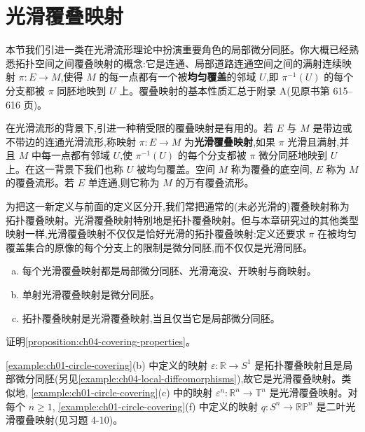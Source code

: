 \documentclass[../../main.tex]{subfiles}
\begin{document}
\section{光滑覆叠映射}\label{section:ch04-光滑覆叠映射}

本节我们引进一类在光滑流形理论中扮演重要角色的局部微分同胚。你大概已经熟悉拓扑空间之间覆叠映射的概念:它是连通、局部道路连通空间之间的满射连续映射 $\pi:E\to M$,使得 $M$ 的每一点都有一个被\textbf{均匀覆盖}的邻域 $U$,即 $\pi^{-1}(U)$ 的每个分支都被 $\pi$ 同胚地映到 $U$ 上。覆叠映射的基本性质汇总于附录 A(见原书第 615--616 页)。

在光滑流形的背景下,引进一种稍受限的覆叠映射是有用的。若 $E$ 与 $M$ 是带边或不带边的连通光滑流形,称映射 $\pi:E\to M$ 为\textbf{光滑覆叠映射},如果 $\pi$ 光滑且满射,并且 $M$ 中每一点都有邻域 $U$,使 $\pi^{-1}(U)$ 的每个分支都被 $\pi$ 微分同胚地映到 $U$ 上。在这一背景下我们也称 $U$ 被均匀覆盖。空间 $M$ 称为覆叠的底空间, $E$ 称为 $M$ 的覆叠流形。若 $E$ 单连通,则它称为 $M$ 的万有覆叠流形。

为把这一新定义与前面的定义区分开,我们常把通常的(未必光滑的)覆叠映射称为拓扑覆叠映射。光滑覆叠映射特别地是拓扑覆叠映射。但与本章研究过的其他类型映射一样,光滑覆叠映射不仅仅是恰好光滑的拓扑覆叠映射:定义还要求 $\pi$ 在被均匀覆盖集合的原像的每个分支上的限制是微分同胚,而不仅仅是光滑同胚。

\begin{proposition}\label{proposition:ch04-covering-properties}
\begin{enumerate}[(a)]
\item 每个光滑覆叠映射都是局部微分同胚、光滑淹没、开映射与商映射。
\item 单射光滑覆叠映射是微分同胚。
\item 拓扑覆叠映射是光滑覆叠映射,当且仅当它是局部微分同胚。
\end{enumerate}
\end{proposition}

\begin{exercise}\label{exercise:ch04-prove-covering-props}
证明\cref{proposition:ch04-covering-properties}。
\end{exercise}

\begin{example}\label{example:ch04-smooth-coverings}
\cref{example:ch01-circle-covering}(b) 中定义的映射 $\varepsilon:\mathbb{R}\to S^1$ 是拓扑覆叠映射且是局部微分同胚(另见\cref{example:ch04-local-diffeomorphisms}),故它是光滑覆叠映射。类似地, \cref{example:ch01-circle-covering}(c) 中的映射 $\varepsilon^n:\mathbb{R}^n\to\mathbb{T}^n$ 是光滑覆叠映射。对每个 $n\geqslant 1$, \cref{example:ch01-circle-covering}(f) 中定义的映射 $q:S^n\to\mathbb{RP}^n$ 是二叶光滑覆叠映射(见习题 4-10)。
\end{example}
\end{document}
